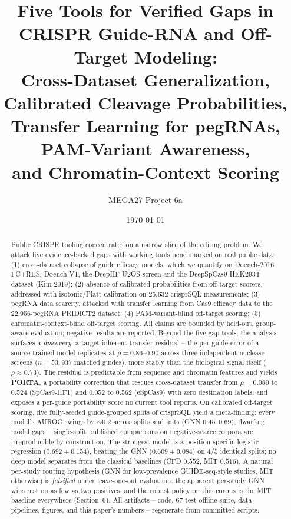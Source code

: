 \documentclass[12pt]{article}
\title{Five Tools for Verified Gaps in CRISPR Guide-RNA and Off-Target Modeling:\\Cross-Dataset Generalization, Calibrated Cleavage Probabilities,\\Transfer Learning for pegRNAs, PAM-Variant Awareness,\\and Chromatin-Context Scoring}
\author{MEGA27 Project 6a}
\date{\today}
\begin{document}
\maketitle
\begin{abstract}
Public CRISPR tooling concentrates on a narrow slice of the editing problem.
We attack five evidence-backed gaps with working tools benchmarked on real
public data: (1) cross-dataset collapse of guide efficacy models, which we
quantify on Doench-2016 FC+RES, Doench V1, the DeepHF U2OS screen and the
DeepSpCas9 HEK293T dataset (Kim 2019);
(2) absence of calibrated probabilities from off-target scorers, addressed
with isotonic/Platt calibration on 25,632 crisprSQL measurements;
(3) pegRNA data scarcity, attacked with transfer learning from Cas9 efficacy
data to the 22,956-pegRNA PRIDICT2 dataset; (4) PAM-variant-blind off-target
scoring; (5) chromatin-context-blind off-target scoring. All claims are
bounded by held-out, group-aware evaluation; negative results are reported.
Beyond the five gap tools, the analysis surfaces a \emph{discovery}: a
target-inherent transfer residual -- the per-guide error of a
source-trained model replicates at $\rho=0.86$--$0.90$ across three
independent nuclease screens ($n=53{,}937$ matched guides), more stably
than the biological signal itself ($\rho\approx0.73$). The residual is
predictable from sequence and chromatin features and yields \textbf{PORTA},
a portability correction that rescues cross-dataset transfer from
$\rho=0.080$ to $0.524$ (SpCas9-HF1) and $0.052$ to $0.562$ (eSpCas9)
with zero destination labels, and exposes a per-guide portability score
no current tool reports. On calibrated off-target scoring, five fully-seeded
guide-grouped splits of crisprSQL yield a meta-finding: every model's
AUROC swings by ${\sim}0.2$ across splits and inits (GNN $0.45$--$0.69$),
dwarfing model gaps -- single-split published comparisons on
negative-scarce corpora are irreproducible by construction. The strongest model is a
position-specific logistic regression ($0.692 \pm 0.154$), beating the
GNN ($0.609 \pm 0.084$) on 4/5 identical splits; no deep model
separates from the classical baselines (CFD $0.552$, MIT $0.516$). A natural per-study routing hypothesis (GNN for
low-prevalence GUIDE-seq-style studies, MIT otherwise) is \emph{falsified}
under leave-one-out evaluation: the apparent per-study GNN wins rest on as
few as two positives, and the robust policy on this corpus is the MIT
baseline everywhere (Section~6). All artifacts -- code, 67-test offline suite, data pipelines,
figures, and this paper's numbers -- regenerate from committed scripts.
\end{abstract}
\end{document}
